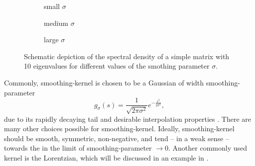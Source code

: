 \begin{figure}[ht]
    \begin{subfigure}[b]{0.32\columnwidth}
        
        \caption{small $\sigma$}
        \label{fig:1-introduction-spectral-density-example-0.01}
    \end{subfigure}
    \begin{subfigure}[b]{0.32\columnwidth}
        
        \caption{medium $\sigma$}
        \label{fig:1-introduction-spectral-density-example-0.02}
    \end{subfigure}
    \begin{subfigure}[b]{0.32\columnwidth}
        
        \caption{large $\sigma$}
        \label{fig:1-introduction-spectral-density-example-0.05}
    \end{subfigure}
    \caption{Schematic depiction of the spectral density of a simple matrix with
    10 eigenvalues for different values of the smothing parameter $\sigma$.}
    \label{fig:1-introduction-smoothened-spectral-density}
\end{figure}

Commonly, \gls{smoothing-kernel} is chosen to be a Gaussian of width \gls{smoothing-parameter}
\begin{equation}
    g_{\sigma}(s) = \frac{1}{\sqrt{2 \pi \sigma^2}} e^{-\frac{s^2}{2\sigma^2}},
    \label{equ:1-introduction-def-gaussian-kernel}
\end{equation}
due to its rapidly decaying tail and desirable interpolation properties \cite{lin2017randomized}.
There are many other choices possible for \gls{smoothing-kernel}. Ideally,
\gls{smoothing-kernel} should be smooth, symmetric, non-negative, and tend -- in a weak sense --
towards the  in the limit of \gls{smoothing-parameter} $\to 0$. Another
commonly used kernel is the Lorentzian, which will be discussed in an example
in .\\

